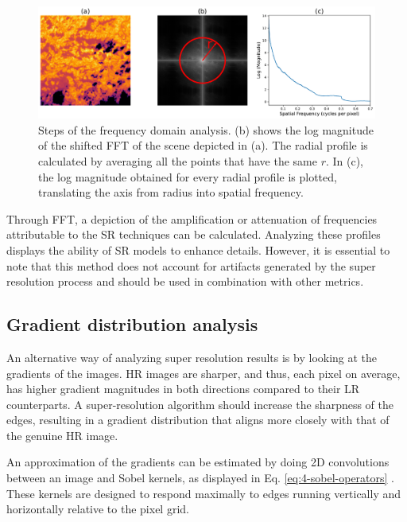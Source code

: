         \begin{figure}[H]
            \centering
            \includegraphics[width=\linewidth]{Includes/4-frequency-analysis.pdf}
            \caption{Steps of the frequency domain analysis. (b) shows the log magnitude of the shifted FFT of the scene depicted in (a). The radial profile is calculated by averaging all the points that have the same $r$. In (c), the log magnitude obtained for every radial profile is plotted, translating the axis from radius into spatial frequency.}
            \label{fig:4-frequency-analysis}
        \end{figure}
        

        Through FFT, a depiction of the amplification or attenuation of frequencies attributable to the SR techniques can be calculated. 
        Analyzing these profiles displays the ability of SR models to enhance details. 
        However, it is essential to note that this method does not account for artifacts generated by the super resolution process and should be used in combination with other metrics.

        \subsection{Gradient distribution analysis}


        An alternative way of analyzing super resolution results is by looking at the gradients of the images. 
        HR images are sharper, and thus, each pixel on average, has higher gradient magnitudes in both directions compared to their LR counterparts.
        A super-resolution algorithm should increase the sharpness of the edges, resulting in a gradient distribution that aligns more closely with that of the genuine HR image.
        
        An approximation of the gradients can be estimated by doing 2D convolutions between an image and Sobel kernels, as displayed in Eq. \ref{eq:4-sobel-operators} \cite{Sobel1990AnI3}.
        These kernels are designed to respond maximally to edges running vertically and horizontally relative to the pixel grid.
        
